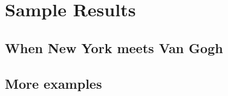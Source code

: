 
\chapter{Sample Results}
\label{chap:results}


\section{When New York meets Van Gogh}





\section{More examples}
